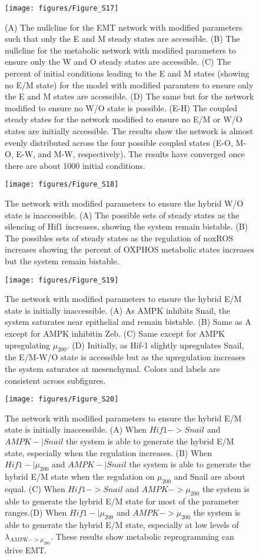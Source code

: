\documentclass{article}
\begin{document}
\begin{figure}
\texttt{[image: figures/Figure\_S17]}
\caption{(A) The nullcline for the EMT network with modified parameters such that only the E and M steady states are accessible. (B) The nullcline for the metabolic network with modified parameters to ensure only the W and O steady states are accessible. (C) The percent of initial conditions leading to the E and M states (showing no E/M state) for the model with modified paramters to ensure only the E and M states are accessible. (D) The same but for the network modified to ensure no W/O state is possible. (E-H) The coupled steady states for the network modified to ensure no E/M or W/O states are initially accessible. The results show the network is almost evenly distributed across the four possible coupled states (E-O, M-O, E-W, and M-W, respectively).  The results have converged once there are about 1000 initial conditions. }
\end{figure}



\begin{figure}
\texttt{[image: figures/Figure\_S18]}
\caption{The network with modified parameters to ensure the hybrid W/O state is inaccessible. (A) The possible sets of steady states as the silencing of Hif1 increases, showing the system remain bistable. (B) The possibles sets of  steady states as the regulation of noxROS increases showing the percent of OXPHOS metabolic states increases but the system remain bistable. }
\end{figure}
\begin{figure}
\texttt{[image: figures/Figure\_S19]}
\caption{The network with modified parameters to ensure the hybrid E/M state is initially inaccessible. (A) As AMPK inhibits Snail, the system saturates near epithelial and remain bistable. (B) Same as A except for AMPK inhibitin Zeb. (C)  Same except for AMPK upregulating $\mu_{200}$. (D) Initially, as Hif-1 slightly upregulates Snail, the E/M-W/O state is accessible but as the upregulation increases the system saturates at mesenchymal. Colors and labels are consistent across subfigures.}
\end{figure}

\begin{figure}
\texttt{[image: figures/Figure\_S20]}
\caption{The network with modified parameters to ensure the hybrid E/M state is initially inaccessible. (A) When $Hif1 -> Snail$ and $AMPK-| Snail$ the system is able to generate the hybrid E/M state, especially when the regulation increases. (B)  When $Hif1 -| \mu_{200}$ and $AMPK-| Snail$ the system is able to generate the hybrid E/M state when the regulation on $\mu_{200}$ and Snail are about equal. (C)  When $Hif1 -> Snail$ and $AMPK-> \mu_{200}$ the system is able to generate the hybrid E/M state for most of the parameter ranges.(D)  When $Hif1 -| \mu_{200}$ and $AMPK-> \mu_{200}$ the system is able to generate the hybrid E/M state, especially at low levels of $\lambda_{AMPK-> \mu_{200}}$. These results show metabolic reprogramming can drive EMT. }
\end{figure}
\end{document}
